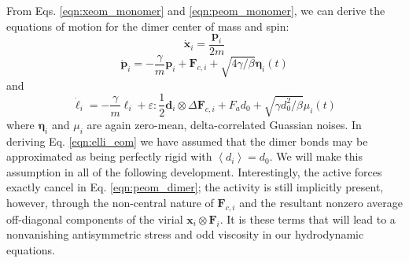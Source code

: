 \documentclass[%
 reprint,
superscriptaddress,
longbibliography,
 amsmath,amssymb,
 prl,
 citeautoscript,
]{revtex4-1}
\begin{document}
From Eqs. \ref{eqn:xeom_monomer} and \ref{eqn:peom_monomer}, we can derive the equations of motion for the dimer center of mass and spin:
\begin{equation}
\dot{\boldsymbol x}_i = \frac{{\boldsymbol p}_i}{2m}
\label{eqn:xeom_dimer}
\end{equation}
\begin{equation}
\dot{\boldsymbol p}_i = - \frac{\gamma}{m} {\boldsymbol p}_i + {\boldsymbol F}_{c,i} + \sqrt{4 \gamma / \beta} {\boldsymbol \eta}_i (t)
\label{eqn:peom_dimer}
\end{equation}
and
\begin{equation}
\dot{\ell}_i = - \frac{\gamma}{m} \ell_i + \varepsilon : \frac{1}{2} {\boldsymbol d}_i \otimes \Delta {\boldsymbol F}_{c,i} + F_a d_0 + \sqrt{\gamma d_0^2 / \beta} \mu_i(t)
\label{eqn:elli_eom}
\end{equation}
where ${\boldsymbol \eta}_i$ and $\mu_i$ are again zero-mean, delta-correlated Guassian noises. In deriving Eq. \ref{eqn:elli_eom} we have assumed that the dimer bonds may be approximated as being perfectly rigid with $\left\langle d_i \right\rangle = d_0$. We will make this assumption in all of the following development. Interestingly, the active forces exactly cancel in Eq. \ref{eqn:peom_dimer}; the activity is still implicitly present, however, through the non-central nature of ${\boldsymbol F}_{c,i}$ and the resultant nonzero average off-diagonal components of the virial ${\boldsymbol x}_i \otimes {\boldsymbol F}_i$. It is these terms that will lead to a nonvanishing antisymmetric stress and odd viscosity in our hydrodynamic equations.
\end{document}
